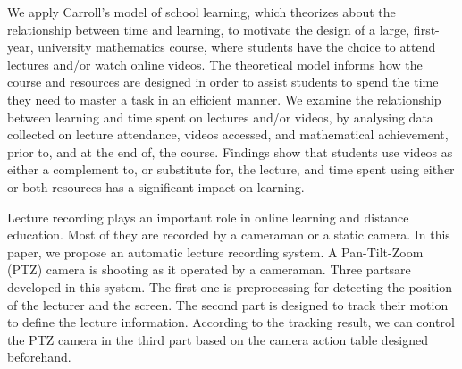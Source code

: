 We apply Carroll's model of school learning, which theorizes about the relationship between time and learning, to motivate the design of a large, first-year, university mathematics course, where students have the choice to attend lectures and/or watch online videos. The theoretical model informs how the course and resources are designed in order to assist students to spend the time they need to master a task in an efficient manner. We examine the relationship between learning and time spent on lectures and/or videos, by analysing data collected on lecture attendance, videos accessed, and mathematical achievement, prior to, and at the end of, the course. Findings show that students use videos as either a complement to, or substitute for, the lecture, and time spent using either or both resources has a significant impact on learning.\cite{Meehan2019}


Lecture recording plays an important role in online learning and distance education. Most of they are recorded by a cameraman or a static camera. In this paper, we propose an automatic lecture recording system. A Pan-Tilt-Zoom (PTZ) camera is shooting as it operated by a cameraman. Three partsare developed in this system. The first one is preprocessing for detecting the position of the lecturer and the screen. The second part is designed to track their motion to define the lecture information. According to the tracking result, we can control the PTZ camera in the third part based on the camera action table designed beforehand.\cite{Chou2010}